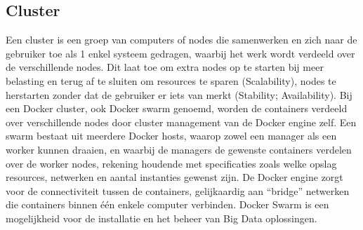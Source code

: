 \subsection{Cluster}
Een cluster is een groep van computers of nodes die samenwerken en zich naar de gebruiker toe als 1 enkel systeem gedragen, waarbij het werk wordt verdeeld over de verschillende nodes. Dit laat toe om extra nodes op te starten bij meer belasting en terug af te sluiten om resources te sparen (Scalability), nodes te herstarten zonder dat de gebruiker er iets van merkt (Stability; Availability).\autocite{Nordhoff2020}
\newline
\newline
Bij een Docker cluster, ook Docker swarm genoemd, worden de containers verdeeld over verschillende nodes door cluster management van de Docker engine zelf. Een swarm bestaat uit meerdere Docker hosts, waarop zowel een manager als een worker kunnen draaien, en waarbij de managers de gewenste containers verdelen over de worker nodes, rekening houdende met specificaties zoals welke opslag resources, netwerken en aantal instanties gewenst zijn. De Docker engine zorgt voor de connectiviteit tussen de containers, gelijkaardig aan ``bridge'' netwerken die containers binnen één enkele computer verbinden.\autocite{Docker2023b}
\newline
\newline
Docker Swarm is een mogelijkheid voor de installatie en het beheer van Big Data oplossingen.
\newline
\newline


